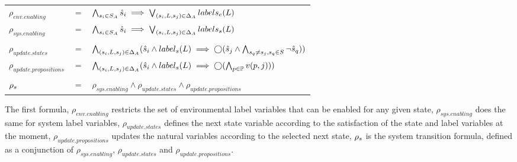 \vspace{1em}
\begin{tabular}{ l c l }
	$\rho_{env.enabling}$ &$=$& $\bigwedge_{s_i \in S_A} \hat{s}_{i} \implies \bigvee_{(s_i,L,s_j) \in \Delta_A}labels_e(L)$\\
	$\rho_{sys.enabling}$ &$=$& $\bigwedge_{s_i \in S_A} \hat{s}_{i} \implies \bigvee_{(s_i,L,s_j) \in \Delta_A}labels_s(L)$\\
	&&\\
	$\rho_{update.states}$&$=$&$\bigwedge_{(s_i,L,s_j) \in \Delta_A} (\hat{s}_{i} \wedge label_s(L) \implies \bigcirc(\hat{s}_{j} \wedge\bigwedge_{s_q \neq s_j, s_q \in S}\neg \hat{s}_{q}) ) $\\
	$\rho_{update.propositions}$&$=$&$\bigwedge_{(s_i,L,s_j) \in \Delta_A} (\hat{s}_{i} \wedge label_s(L) \implies \bigcirc(\bigwedge_{p \in \mathbb{P}}v(p,j) ) )$\\
	&&\\
	${\rho_s}$&$=$&$\rho_{sys.enabling} \wedge  \rho_{update.states} \wedge  \rho_{update.propositions}$\\	
\end{tabular}
\vspace{1em}

The first formula, $\rho_{env.enabling}$ restricts the set of environmental label variables that can be enabled for any given state, $\rho_{sys.enabling}$ does the same for system label variables, $\rho_{update.states}$ defines the next state variable according to the satisfaction of the state and label variables at the moment, $\rho_{update.propositions}$ updates the natural variables according to the selected next state, ${\rho_s}$ is the system transition formula, defined as a conjunction of $\rho_{sys.enabling}$, $\rho_{update.states}$ and $\rho_{update.propositions}$.
%
%


